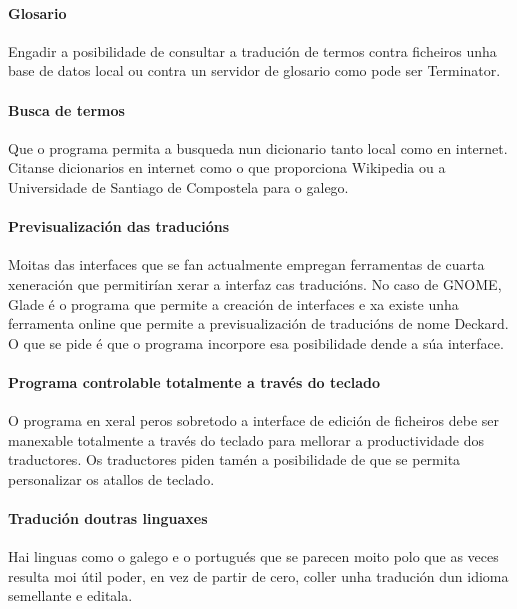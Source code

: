 	\paragraph{Glosario} Engadir a posibilidade de consultar a tradución de termos contra ficheiros unha base de datos local ou contra un servidor de glosario como pode ser Terminator.

	\paragraph{Busca de termos} Que o programa permita a busqueda nun dicionario tanto local como en internet. Citanse dicionarios en internet como o que proporciona Wikipedia ou a Universidade de Santiago de Compostela para o galego.

	\paragraph{Previsualización das traducións} Moitas das interfaces que se fan actualmente empregan ferramentas de cuarta xeneración que permitirían xerar a interfaz cas traducións. No caso de GNOME, Glade é o programa que permite a creación de interfaces e xa existe unha ferramenta online que permite a previsualización de traducións de nome Deckard. O que se pide é que o programa incorpore esa posibilidade dende a súa interface.

	\paragraph{Programa controlable totalmente a través do teclado} O programa en xeral peros sobretodo a interface de edición de ficheiros debe ser manexable totalmente a través do teclado para mellorar a productividade dos traductores. Os traductores piden tamén a posibilidade de que se permita personalizar os atallos de teclado.

	\paragraph{Tradución doutras linguaxes} Hai linguas como o galego e o portugués que se parecen moito polo que as veces resulta moi útil poder, en vez de partir de cero, coller unha tradución dun idioma semellante e editala.

